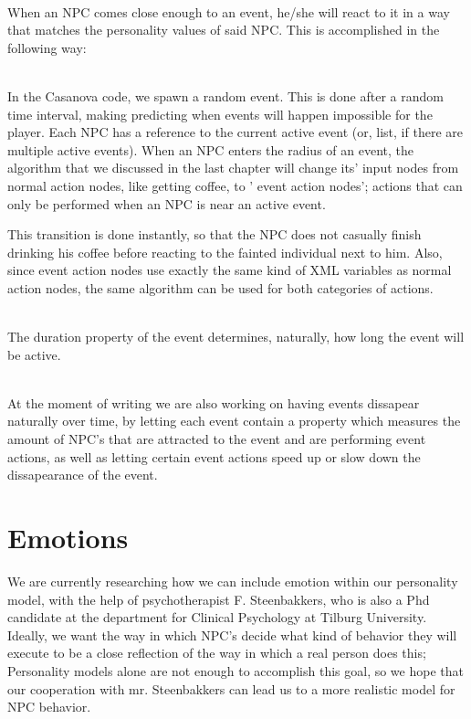 \documentclass[11pt]{article} %
\begin{document}
~\\
When an NPC comes close enough to an event, he/she will react to it in a way that matches the personality values of said NPC. This is accomplished in the following way:

~\\
In the Casanova code, we spawn a random event. This is done after a random time interval, making predicting when events will happen impossible for the player. Each NPC has a reference to the current active event (or, list, if there are multiple active events). When an NPC enters the radius of an event, the algorithm that we discussed in the last chapter will change its' input nodes from normal action nodes, like getting coffee, to ' event action nodes'; actions that can only be performed when an NPC is near an active event.

\newpage
This transition is done instantly, so that the NPC does not casually finish drinking his coffee before reacting to the fainted individual next to him. Also, since event action nodes use exactly the same kind of XML variables as normal action nodes, the same algorithm can be used for both categories of actions. 

~\\
The duration property of the event determines, naturally, how long the event will be active.  

~\\
At the moment of writing we are also working on having events dissapear naturally over time, by letting each event contain a property which measures the amount of NPC's that are attracted to the event and are performing event actions, as well as letting certain event actions speed up or slow down the dissapearance of the event. 

\newpage
\section{Emotions}
We are currently researching how we can include emotion within our personality model, with the help of psychotherapist F. Steenbakkers, who is also a Phd candidate at the department for Clinical Psychology at Tilburg University. Ideally, we want the way in which NPC's decide what kind of behavior they will execute to be a close reflection of the way in which a real person does this; Personality models alone are not enough to accomplish this goal, so we hope that our cooperation with mr. Steenbakkers can lead us to a more realistic model for NPC behavior. 
\end{document}
